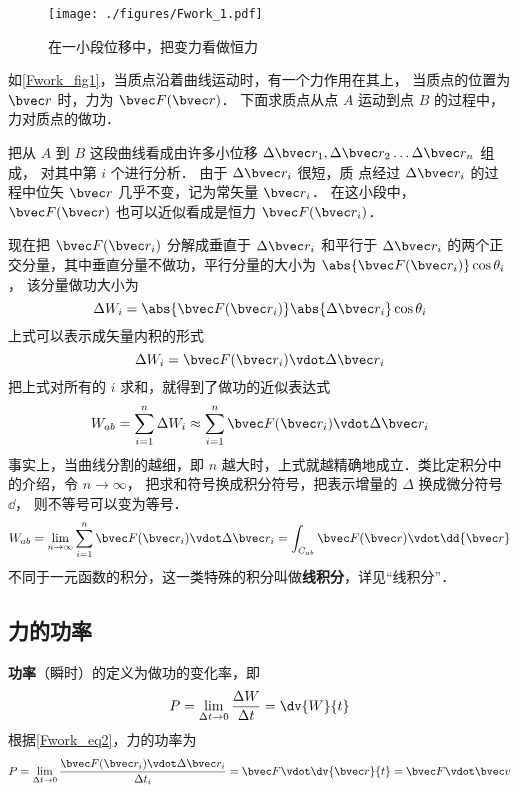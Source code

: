 

\begin{figure}[ht]
\centering
\texttt{[image: ./figures/Fwork\_1.pdf]}
\caption{在一小段位移中，把变力看做恒力}\label{Fwork_fig1}
\end{figure}

如\autoref{Fwork_fig1}，当质点沿着曲线运动时，有一个力作用在其上， 当质点的位置为 $\bvec r$ 时，力为 $\bvec F(\bvec r)$． 下面求质点从点 $A$ 运动到点 $B$ 的过程中，力对质点的做功．

把从 $A$ 到 $B$ 这段曲线看成由许多小位移 $\Delta \bvec r_1, \Delta \bvec r_2 \dots \Delta \bvec r_n$ 组成， 对其中第 $i$ 个进行分析． 由于 $\Delta \bvec r_i$ 很短，质
点经过 $\Delta \bvec r_i$ 的过程中位矢 $\bvec r$ 几乎不变，记为常矢量 $\bvec r_i$． 在这小段中，  $\bvec F(\bvec r)$ 也可以近似看成是恒力 $\bvec F(\bvec r_i)$． 

现在把 $\bvec F(\bvec r_i)$ 分解成垂直于 $\Delta \bvec r_i$ 和平行于 $\Delta \bvec r_i$ 的两个正交分量，其中垂直分量不做功，平行分量的大小为 $ \abs{\bvec F(\bvec r_i)} \cos \theta_i$， 该分量做功大小为
\begin{equation}
\Delta W_i = \abs{\bvec F(\bvec r_i)} \abs{\Delta \bvec r_i} \cos \theta_i
\end{equation}
上式可以表示成矢量内积的形式
\begin{equation}\label{Fwork_eq2}
\Delta W_i = \bvec F(\bvec r_i) \vdot \Delta \bvec r_i
\end{equation}
把上式对所有的 $i$ 求和，就得到了做功的近似表达式
\begin{equation}
W_{ab} = \sum_{i = 1}^n \Delta W_i  \approx \sum_{i = 1}^n \bvec F(\bvec r_i) \vdot \Delta \bvec r_i 
\end{equation} 
事实上，当曲线分割的越细，即 $n$ 越大时，上式就越精确地成立．类比定积分中的介绍，令 $n \to \infty $， 把求和符号换成积分符号，把表示增量的 $\Delta $ 换成微分符号 $\dd{}$， 则不等号可以变为等号．
\begin{equation}
W_{ab} = \lim_{n \to \infty } \sum_{i = 1}^n \bvec F(\bvec r_i) \vdot \Delta \bvec r_i  = \int_{C_{ab}} \bvec F(\bvec r) \vdot \dd{\bvec r}
\end{equation} 
不同于一元函数的积分，这一类特殊的积分叫做\textbf{线积分}，详见“线积分”．

\subsection{力的功率}
\textbf{功率}（瞬时）的定义为做功的变化率，即
\begin{equation}
P = \lim_{\Delta t\to 0} \frac{\Delta W}{\Delta t} = \dv{W}{t}
\end{equation}
根据\autoref{Fwork_eq2}，力的功率为
\begin{equation}
P = \lim_{\Delta t\to 0} \frac{\bvec F(\bvec r_i)\vdot\Delta\bvec r_i}{\Delta t_i} = \bvec F \vdot\dv{\bvec r}{t} = \bvec F\vdot\bvec v
\end{equation}






